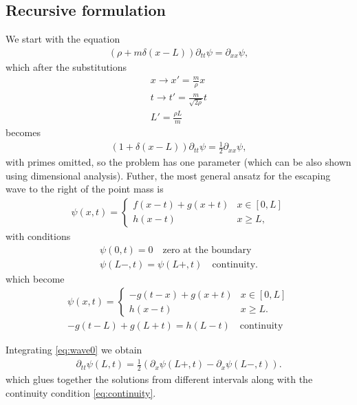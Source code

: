 \documentclass[
a4paper,%
10pt,%
titlepage,%
twoside%
]{article}
\begin{document}
\subsection{Recursive formulation}
We start with the equation
\begin{gather}
  \label{eq:wave0}
  (\rho+m\delta(x-L))\partial_{tt}\psi=\partial_{xx}\psi,
\end{gather}
which after the substitutions
\begin{gather}
  \label{eq:subs0}
  x\rightarrow x'=\frac{m}{\rho} x         \\
  t\rightarrow t'=\frac{m}{\sqrt{2\rho}} t \\
  L'=\frac{\rho L}{m}
\end{gather}
becomes
\begin{gather}
  \label{eq:wave0}
  (1+\delta(x-L))\partial_{tt}\psi=\frac{1}{2}\partial_{xx}\psi,
\end{gather}
with primes omitted, so the problem has one parameter (which can be
also shown using dimensional analysis). Futher, the most general
ansatz for the escaping wave to the right of the point mass is
\begin{gather}
  \label{eq:ansatz0}
  \psi(x,t)=
  \begin{cases}
    f(x-t)+g(x+t) & x\in[0,L] \\
    h(x-t)        & x\ge L,
  \end{cases}
\end{gather}
with conditions
\begin{gather}
  \label{eq:boundary}
  \psi(0,t) = 0\quad\text{zero at the boundary}\\
  \label{eq:continuity}
  \psi(L-,t)=\psi(L+,t)\quad\text{continuity}.
\end{gather}
which become
\begin{gather}
  \label{eq:ansatz0}
  \psi(x,t)=
  \begin{cases}
    -g(t-x)+g(x+t) & x\in[0,L] \\
    h(x-t)         & x\ge L.
  \end{cases}\\
  \label{eq:cont0}
  -g(t-L)+g(L+t)=h(L-t)\quad\text{continuity}
\end{gather}

Integrating \eqref{eq:wave0} we obtain
\begin{gather}
  \partial_{tt}\psi(L,t)=\frac{1}{2}(\partial_x\psi(L+,t)-\partial_x\psi(L-,t)).
\end{gather}
which glues together the solutions from different intervals along with
the continuity condition \eqref{eq:continuity}.
\end{document}
